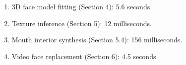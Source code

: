 \documentclass[10pt,twocolumn,letterpaper]{article}
\begin{document}

\begin{enumerate}
\item 3D face model fitting (Section 4): 5.6 seconds
\item Texture inference (Section 5): 12 milliseconds.
\item Mouth interior synthesis (Section 5.4): 156 milliseconds.
\item Video face replacement (Section 6): 4.5 seconds.
\end{enumerate}



\end{document}
